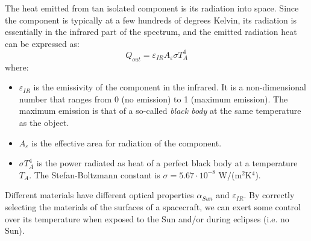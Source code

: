The heat emitted from tan isolated component is its radiation into space.
Since the component is typically at a few hundreds of degrees Kelvin, its
radiation is essentially in the infrared part of the spectrum, and the
emitted radiation heat can be expressed as:
%
\begin{equation}
Q_{out} = \varepsilon_{IR} A_\varepsilon \sigma T^4_A
\end{equation}
%
where:
%
\begin{itemize}
\item $\varepsilon_{IR}$ is the emissivity of the component in the infrared. 
It is a non-dimensional number that ranges from 0 (no emission) to 1 (maximum 
emission). The maximum emission is that of a so-called \emph{black body} at 
the same temperature as the object.
\item $A_\varepsilon$ is the effective area for radiation of the component.
\item $\sigma T^4_A$ is the power radiated as heat of a perfect black body at 
a temperature $T_A$. The Stefan-Boltzmann constant is 
$\sigma=5.67\cdot 10^{-8}$ W/(m$^2$K$^4$).
\end{itemize}
%

Different materials have different optical properties $\alpha_{Sun}$ and
$\varepsilon_{IR}$. By correctly selecting the materials of the surfaces of a
spacecraft, we can exert some control over its temperature when exposed to the
Sun and/or during eclipses (i.e. no Sun).
